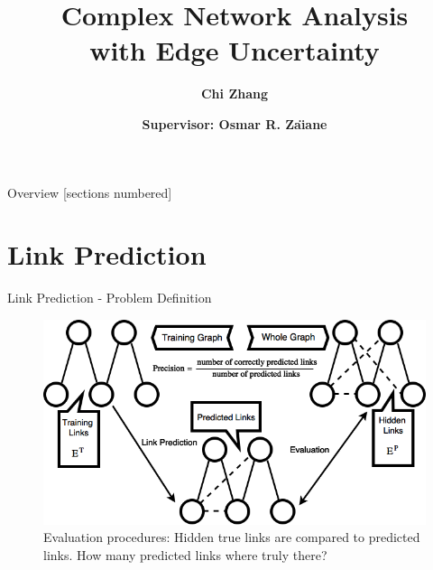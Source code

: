 \documentclass[9pt]{beamer}
\title{Complex Network Analysis \\
with Edge Uncertainty}
\date{\textbf{Supervisor: Osmar R. Za\"{\i}ane}}
\author{\textbf{Chi Zhang}}
\institute{March 10, 2018}
\begin{document}
\maketitle

\begin{frame}{Overview}
  [sections numbered]
  \vspace{0.1in}
  \tableofcontents
\end{frame}

\section{Link Prediction}

\begin{frame}{Link Prediction - Problem Definition}
\begin{figure}
\centering
\includegraphics[scale = 0.4]{evaluation.png}
\caption{Evaluation procedures: Hidden true links are compared to predicted links. How many predicted links where truly there?}
\label{example}
\end{figure}
\end{frame}
\end{document}
